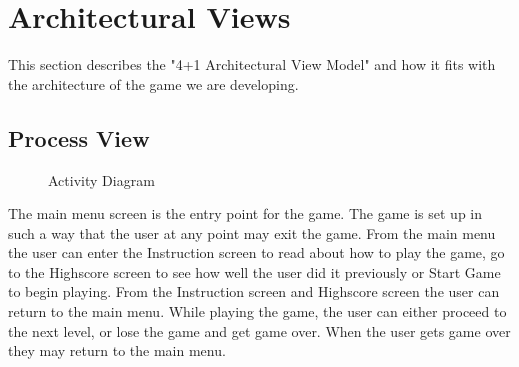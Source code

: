\section{Architectural Views}

This section describes the "4+1 Architectural View Model"\cite{architecturalViews} and how it fits
with the architecture of the game we are developing.

\subsection*{Process View}

	\begin{figure}[H]
		\centering
		\caption{Activity Diagram}
	\end{figure}

	The main menu screen is the entry point for the game. The game is set up in such a way that the 
	user at any point may exit the game. From the main menu the user can enter the Instruction screen 
	to read about how to play the game, go to the Highscore screen to see how well the user did it 
	previously or Start Game to begin playing. From the Instruction screen and Highscore screen the 
	user can return to the main menu. While playing the game, the user can either proceed to the 
	next level, or lose the game and get game over. When the user gets game over they may return to 
	the main menu.

